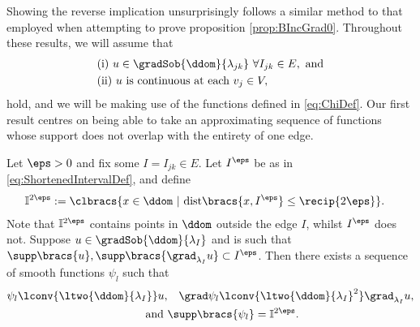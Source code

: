 Showing the reverse implication unsurprisingly follows a similar method to that employed when attempting to prove proposition \ref{prop:BIncGrad0}.
Throughout these results, we will assume that
\begin{align*}
		&\text{(i)} \ u\in\gradSob{\ddom}{\lambda_{jk}} \ \forall I_{jk}\in E, \text{ and}\\
		&\text{(ii)} \ u \text{ is continuous at each } v_j\in V,
\end{align*}
hold, and we will be making use of the functions defined in \eqref{eq:ChiDef}.
Our first result centres on being able to take an approximating sequence of functions whose support does not overlap with the entirety of one edge.
\begin{lemma} \label{lem:SelectiveApproximatingSequences}
	Let $\eps>0$ and fix some $I=I_{jk}\in E$.
	Let $I^\eps$ be as in \eqref{eq:ShortenedIntervalDef}, and define
	\begin{align*}
		\mathbb{I}^{2\eps} &:= \clbracs{x\in\ddom \ \vert \ \mathrm{dist}\bracs{x, I^\eps}\leq\recip{2\eps}}.
	\end{align*}
	Note that $\mathbb{I}^{2\eps}$ contains points in $\ddom$ outside the edge $I$, whilst $I^\eps$ does not.
	Suppose $u\in\gradSob{\ddom}{\lambda_I}$ and is such that $\supp\bracs{u}, \supp\bracs{ \grad_{\lambda_I} u }\subset I^\eps$.
	Then there exists a sequence of smooth functions $\psi_l$ such that
	\begin{align*}
		\psi_l \lconv{\ltwo{\ddom}{\lambda_I}} u, 
		&\quad \grad\psi_l \lconv{\ltwo{\ddom}{\lambda_I}^2} \grad_{\lambda_I} u, \\
		\text{and } &\supp\bracs{\psi_l} = \mathbb{I}^{2\eps}.
	\end{align*}
\end{lemma}
